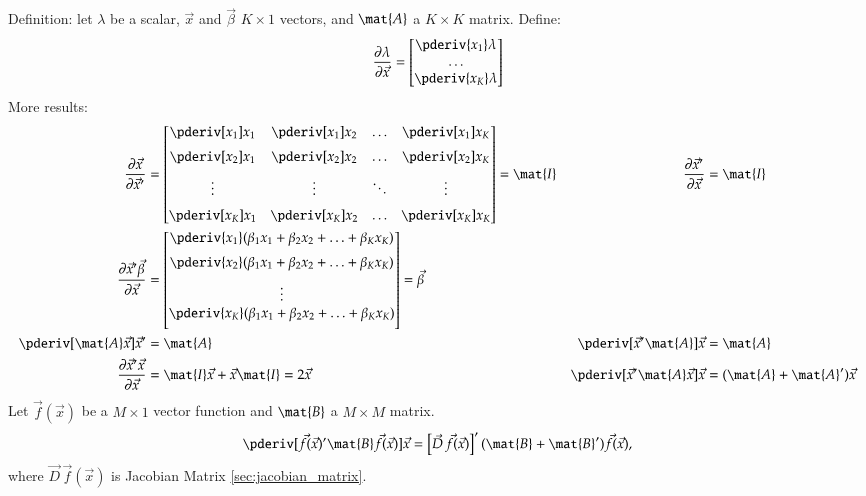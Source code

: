 \documentclass[a4paper]{article}
\numberwithin{equation}{subsection}
\begin{document}
Definition: let $\lambda$ be a scalar, $\vec{x}$ and $\vec{\beta}$ $K \times 1$
vectors, and $\mat{A}$ a $K\times K$ matrix.  Define:
\begin{equation}
  \frac{\partial \lambda}{\partial \vec{x}}
  =
  \begin{bmatrix}
    \pderiv{x_1}\lambda\\
    \dots\\
    \pderiv{x_K}\lambda
  \end{bmatrix}
\end{equation}
More results:
\begin{alignat}{2}
  \frac{\partial \vec{x}}{\partial \vec{x}'} &= 
  \begin{bmatrix}
    \pderiv[x_{1}]{x_{1}} & \pderiv[x_{1}]{x_{2}} & \hdots & \pderiv[x_{1}]{x_{K}}\\[1.2ex]
    \pderiv[x_{2}]{x_{1}} & \pderiv[x_{2}]{x_{2}} & \hdots & \pderiv[x_{2}]{x_{K}}\\[1.2ex]
    \vdots               & \vdots              & \ddots & \vdots\\[1.2ex]
    \pderiv[x_{K}]{x_{1}} & \pderiv[x_{K}]{x_{2}} & \hdots & \pderiv[x_{K}]{x_{K}}\\
  \end{bmatrix}
  =
  \mat{I}
  &
  \frac{\partial \vec{x}'}{\partial \vec{x}} &= \mat{I}
  \\
  \frac{\partial \vec{x}' \vec{\beta}}{\partial \vec{x}} &= 
  \begin{bmatrix}
    \pderiv{x_{1}}( \beta_{1} x_{1} + \beta_{2} x_{2} + \hdots + \beta_{K} x_{K})\\[1.2ex]
    \pderiv{x_{2}}( \beta_{1} x_{1} + \beta_{2} x_{2} + \hdots + \beta_{K} x_{K})\\[1.2ex]
    \vdots\\
    \pderiv{x_{K}}( \beta_{1} x_{1} + \beta_{2} x_{2} + \hdots + \beta_{K} x_{K})\\[1.2ex]
  \end{bmatrix}
  =
  \vec{\beta}
  \\
  \pderiv[\mat{A} \vec{x}]{\vec{x}'} &= \mat{A}
  &
  \pderiv[\vec{x}'\mat{A}]{\vec{x}} &= \mat{A}
  \\
  \frac{\partial \vec{x}'\vec{x}}{\partial \vec{x}} &= \mat{I}\vec{x} + \vec{x}\mat{I} = 2\vec{x} 
  &
  \pderiv[\vec{x}' \mat{A} \vec{x}]{\vec{x}} 
  &= (\mat{A} + \mat{A}') \vec{x}
\end{alignat}
Let $\vec{f}(\vec{x})$ be a $M\times 1$ vector function and $\mat{B}$
a $M\times M$ matrix.
\begin{equation}
  \pderiv[\vec{f}(\vec{x})' \mat{B} \vec{f}(\vec{x})]{\vec{x}} 
  = 
  \left[ \vec{D}\,\vec{f}(\vec{x}) \right]'
  (\mat{B} + \mat{B}') \vec{f}(\vec{x}),
\end{equation}
where $\vec{D}\,\vec{f}(\vec{x})$ is Jacobian Matrix \eqref{sec:jacobian_matrix}.
\end{document}
